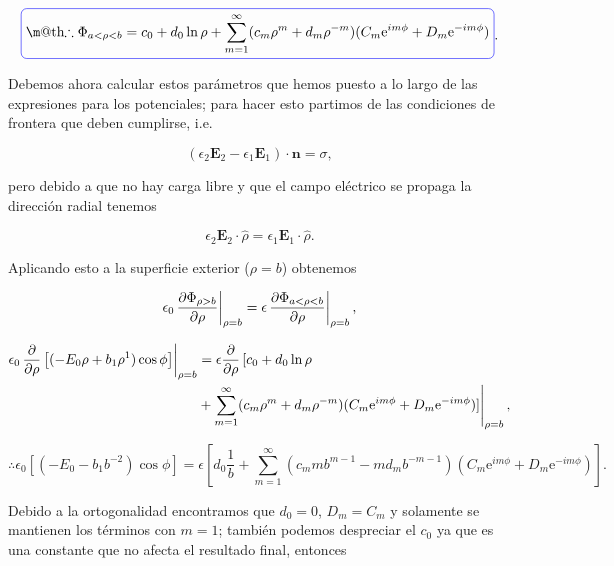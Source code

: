 \documentclass[a4paper,11pt]{article}
\makeatletter
\numberwithin{equation}{section}
\newcommand{\zerodel}{.\kern-\nulldelimiterspace}
\newcommand*{\boxcolor}{blue}
\renewcommand{\boxed}[1]{\textcolor{\boxcolor}{%
\tikz[baseline={([yshift=-1ex]current bounding box.center)}] \node [rectangle, minimum width=1ex,rounded corners,draw] {\normalcolor\m@th$\displaystyle#1$};}}
\newcommand{\euler}{\mathrm{e}}
\makeatother
\begin{document}
\begin{equation}
 \boxed{\therefore \Phi_{a < \rho < b} = c_0 + d_0 \ln{\rho} + \sum_{m=1}^\infty (c_m \rho^m + d_m \rho^{-m})
 (C_m \euler^{im\phi} + D_m \euler^{-im\phi})}.
\end{equation}

Debemos ahora calcular estos parámetros que hemos puesto a lo largo de las expresiones 
para los potenciales; para hacer esto partimos de las condiciones de frontera que 
deben cumplirse, i.e.

\begin{equation}
 (\epsilon_2 \mathbf{E}_2 - \epsilon_1 \mathbf{E}_1)\cdot \mathbf{n} = \sigma,
\end{equation}

pero debido a que no hay carga libre y que el campo eléctrico se propaga la dirección 
radial tenemos 

\begin{equation}
  \epsilon_2 \mathbf{E}_2 \cdot \hat{\rho} =
  \epsilon_1 \mathbf{E}_1 \cdot \hat{\rho}.
\end{equation}

Aplicando esto a la superficie exterior ($\rho = b$) obtenemos

\begin{equation}
 \epsilon_0 \left\zerodel\frac{\partial \Phi_{\rho>b}}{\partial \rho}\right|_{\rho=b} = 
 \epsilon \left\zerodel\frac{\partial \Phi_{a < \rho < b}}{\partial \rho}\right|_{\rho=b},
\end{equation}

\begin{align*}
 \epsilon_0 \left\zerodel\frac{\partial}{\partial \rho}\left[ (-E_0 \rho + b_1 \rho^{1})\cos{\phi}
 \right]\right|_{\rho=b} &= \epsilon \frac{\partial}{\partial \rho} \left[c_0 + d_0 \ln{\rho}\right\zerodel \\
 &+ \left\zerodel\sum_{m=1}^\infty (c_m \rho^m + d_m \rho^{-m})
 (C_m \euler^{im\phi} + D_m \euler^{-im\phi})]\right|_{\rho=b},
\end{align*}

\begin{equation*}
 \therefore \epsilon_0\left[(-E_0 - b_1b^{-2})\cos{\phi}\right] = 
 \epsilon \left[ d_0 \frac{1}{b} + \sum_{m=1}^\infty(c_m m b^{m-1} - 
 m d_m b^{-m-1})(C_m \euler^{im\phi} + D_m \euler^{-im\phi})\right].
\end{equation*}

Debido a la ortogonalidad encontramos que $d_0 = 0$, $D_m = C_m$ y solamente se 
mantienen los términos con $m=1$; también podemos despreciar el $c_0$ ya que es 
una constante que no afecta el resultado final, entonces 
\end{document}
